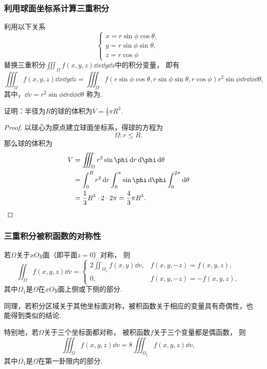 \subsubsection{利用球面坐标系计算三重积分}
利用以下关系\[
	\left\{ \begin{array}{l}
		x = r \sin\phi \cos\theta, \\
		y = r \sin\phi \sin\theta, \\
		z = r \cos\phi
	\end{array} \right.
\]替换三重积分\(\iiint_\Omega{f(x,y,z)\dd{x}\dd{y}\dd{z}}\)中的积分变量，
即有\[
	\iiint_\Omega{f(x,y,z)\dd{x}\dd{y}\dd{z}}
	= \iiint_\Omega{f(r \sin\phi \cos\theta,r \sin\phi \sin\theta,r \cos\phi) r^2 \sin\phi \dd{r} \dd{\phi} \dd{\theta}},
\]
其中，\(\dd{v} = r^2 \sin\phi \dd{r} \dd{\phi} \dd{\theta}\)
称为.

\begin{example}
证明：半径为\(R\)的球的体积为\(V = \frac{4}{3} \pi R^3\).
\begin{proof}
以球心为原点建立球面坐标系，得球的方程为\[
	\Omega: r \leq R.
\]
那么球的体积为\begin{align*}
	V &= \iiint_\Omega r^2 \sin\phi \dd{r} \dd{\phi} \dd{\theta} \\
	&= \int_0^R r^2 \dd{r} \int_0^\pi \sin\phi \dd{\phi} \int_0^{2\pi} \dd{\theta} \\
	&= \frac{1}{3} R^3 \cdot 2 \cdot 2\pi
	= \frac{4}{3} \pi R^3.
	\qedhere
\end{align*}
\end{proof}
\end{example}

\subsubsection{三重积分被积函数的对称性}
若\(\Omega\)关于\(xOy\)面（即平面\(z=0\)）对称，
则\[
	\iint_\Omega f(x,y,z) \dd{v}
	= \left\{ \begin{array}{cc}
		2 \iint_{\Omega_1} f(x,y) \dd{v}, & f(x,y,-z) = f(x,y,z), \\
		0, & f(x,y,-z) = -f(x,y,z),
	\end{array} \right.
\]
其中\(\Omega_1\)是\(\Omega\)在\(xOy\)面上侧或下侧的部分.

同理，若积分区域关于其他坐标面对称，被积函数关于相应的变量具有奇偶性，也能得到类似的结论.

特别地，若\(\Omega\)关于三个坐标面都对称，
被积函数\(f\)关于三个变量都是偶函数，
则\[
	\iiint_\Omega f(x,y,z) \dd{v}
	= 8 \iiint_{\Omega_1} f(x,y,z) \dd{v},
\]
其中\(\Omega_1\)是\(\Omega\)在第一卦限内的部分.

